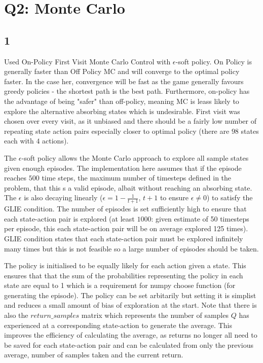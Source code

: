 \section*{Q2: Monte Carlo}
\subsection*{1}
Used On-Policy First Visit Monte Carlo Control with $\epsilon$-soft
policy. On Policy is generally faster than Off Policy MC and 
will converge to the optimal policy faster.
In the case her, convergence will be fast as the game generally
favours greedy policies - the shortest path is the best path.
Furthermore, on-policy has the advantage of being 
"safer" than off-policy, meaning MC is leass likely to 
explore the alternative absorbing states which is undesirable. 
First visit was chosen over every visit, as it unbiased and
there should be a fairly low number of repeating state action pairs
especially closer to optimal policy 
(there are $98$ states each with $4$ actions).

The $\epsilon$-soft policy allows the Monte Carlo approach
to explore all sample states given enough episodes.
The implementation here assumes that if the episode reaches $500$
time steps, the maximum number of timesteps defined in the problem,
that this s a valid episode, albait without reaching an absorbing 
state. The $\epsilon$ is also decaying linearly 
($\epsilon = 1 - \frac{1}{t + 1}$, $t + 1$ to ensure $\epsilon \ne 0$) 
to satisfy the GLIE condition. The number of episodes is set 
sufficiently high to ensure that each state-action 
pair is explored
(at least $1000$: given estimate of 50 timesteps
per episode, this each state-action pair will be on average explored
125 times). 
GLIE condition states that each state-action pair
must be explored infinitely many times but this is not feasible 
so a large number of episodes should be taken. 

The policy is initialised to be equally likely for each action 
given a state. This ensures that that the sum of the probabilities
representing the policy in each state are equal to 1 which is a 
requirement for numpy choose function (for generating the episode).
The policy can be set arbitarily but setting it is simplist and
reduces a small amount of bias of exploration at the start.
Note that there is also the $return\_samples$ matrix which represents
the number of samples $Q$ has experienced at a corresponding 
state-action to generate the average. This improves the efficiency
of calculating the average, as returns no longer all need to be
saved for each state-action pair and can be calculated from 
only the previous average, number of samples taken and the current
return. 


